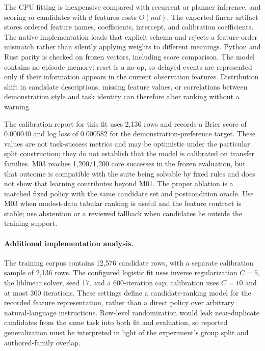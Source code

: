 The CPU fitting is inexpensive compared with recurrent or planner inference, and scoring $m$ candidates with $d$ features costs $O(md)$. The exported linear artifact stores ordered feature names, coefficients, intercept, and calibration coefficients. The native implementation loads that explicit schema and rejects a feature-order mismatch rather than silently applying weights to different meanings. Python and Rust parity is checked on frozen vectors, including score comparison. The model contains no episode memory: reset is a no-op, so delayed events are represented only if their information appears in the current observation features. Distribution shift in candidate descriptions, missing feature values, or correlations between demonstration style and task identity can therefore alter ranking without a warning.

The calibration report for this fit uses 2,136 rows and records a Brier score of 0.000040 and log loss of 0.000582 for the demonstration-preference target. These values are not task-success metrics and may be optimistic under the particular split construction; they do not establish that the model is calibrated on transfer families. M03 reaches 1,200/1,200 core successes in the frozen evaluation, but that outcome is compatible with the suite being solvable by fixed rules and does not show that learning contributes beyond M01. The proper ablation is a matched fixed policy with the same candidate set and postcondition oracle. Use M03 when modest-data tabular ranking is useful and the feature contract is stable; use abstention or a reviewed fallback when candidates lie outside the training support.



\paragraph{Additional implementation analysis.} The training corpus contains 12,576 candidate rows, with a separate calibration sample of 2,136 rows. The configured logistic fit uses inverse regularization $C=5$, the liblinear solver, seed 17, and a 600-iteration cap; calibration uses $C=10$ and at most 300 iterations. These settings define a candidate-ranking model for the recorded feature representation, rather than a direct policy over arbitrary natural-language instructions. Row-level randomization would leak near-duplicate candidates from the same task into both fit and evaluation, so reported generalization must be interpreted in light of the experiment's group split and authored-family overlap.

